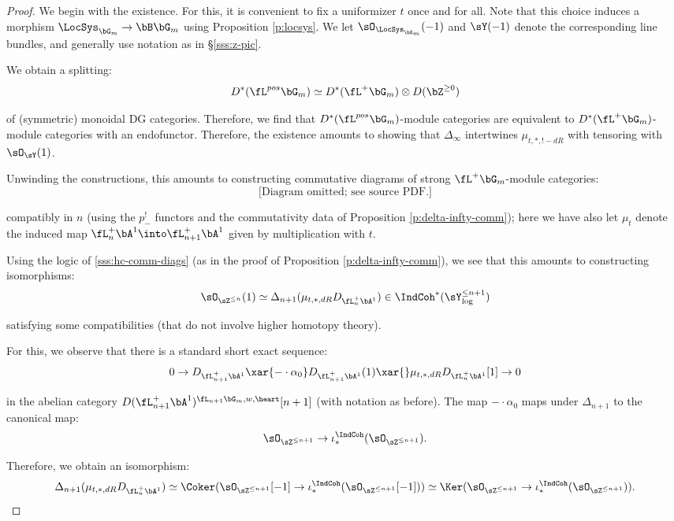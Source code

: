 \begin{proof}

We begin with the existence. For this, it is convenient to fix a
uniformizer $t$ once and for all. Note that this choice
induces a morphism $\LocSys_{\bG_m} \to \bB \bG_m$ using
Proposition \ref{p:locsys}. We let $\sO_{\LocSys_{\bG_m}}(-1)$ and
$\sY(-1)$ denote
the corresponding line bundles, and generally use notation as in
\S \ref{sss:z-pic}.

We obtain a splitting:
%
\[
D^*(\fL^{pos} \bG_m) \simeq D^*(\fL^+ \bG_m) \otimes D(\bZ^{\geq 0})
\]

 of (symmetric) monoidal DG categories. Therefore, we find
that $D^*(\fL^{pos} \bG_m)$-module categories are equivalent to
$D^*(\fL^+\bG_m)$-module categories with an endofunctor.
Therefore, the existence amounts to showing that $\Delta_{\infty}$
intertwines $\mu_{t,*,!-dR}$ with tensoring with
$\sO_{\sY}(1)$.

Unwinding the constructions, this amounts to constructing commutative diagrams
of strong $\fL^+\bG_m$-module categories:
%
\[
\text{[Diagram omitted; see source PDF.]}
\]

 compatibly in $n$ (using the $p_{-}^!$ functors and
the commutativity data of Proposition \ref{p:delta-infty-comm});
here we have also let $\mu_t$ denote the induced map
$\fL_n^+\bA^1 \into \fL_{n+1}^+\bA^1$ given by multiplication with $t$.

Using the logic of \eqref{sss:hc-comm-diags} (as in
the proof of Proposition \ref{p:delta-infty-comm}),
we see that this amounts to constructing
isomorphisms:
%
\[
\sO_{\sZ^{\leq n}}(1) \simeq \Delta_{n+1}(\mu_{t,*,dR} D_{\fL_n^+\bA^1}) \in
\IndCoh^*(\sY_{\log}^{\leq n+1})
\]

 satisfying some compatibilities (that do not involve higher
homotopy theory).

For this, we observe that there is a standard short exact sequence:
%
\[
0 \to D_{\fL_{n+1}^+\bA^1} \xar{-\cdot \alpha_0} D_{\fL_{n+1}^+\bA^1}(1) \xar{}
\mu_{t,*,dR} D_{\fL_n^+\bA^1}[1] \to 0
\]

 in the abelian category $D(\fL_{n+1}^+\bA^1)^{\fL_{n+1}\bG_m,w,\heart}[n+1]$
(with notation as before).
The map $-\cdot \alpha_0$ maps under $\Delta_{n+1}$ to the canonical
map:
%
\[
\sO_{\sZ^{\leq n+1}} \to \iota_*^{\IndCoh}(\sO_{\sZ^{\leq n+1}}).
\]

Therefore, we obtain an isomorphism:
%
\[
\Delta_{n+1}(\mu_{t,*,dR} D_{\fL_n^+\bA^1}) \simeq
\Coker(\sO_{\sZ^{\leq n+1}}[-1] \to \iota_*^{\IndCoh}(\sO_{\sZ^{\leq n+1}}[-1]))
\simeq
\Ker(\sO_{\sZ^{\leq n+1}} \to \iota_*^{\IndCoh}(\sO_{\sZ^{\leq n+1}})).
\]


\end{proof}
